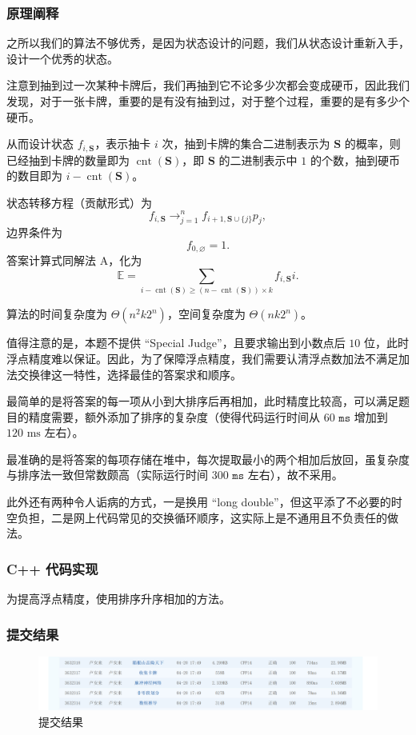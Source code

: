 		\subsubsection{原理阐释}
			\par 之所以我们的算法不够优秀，是因为状态设计的问题，我们从状态设计重新入手，设计一个优秀的状态。
			\par 注意到抽到过一次某种卡牌后，我们再抽到它不论多少次都会变成硬币，因此我们发现，对于一张卡牌，重要的是有没有抽到过，对于整个过程，重要的是有多少个硬币。
			\par 从而设计状态 $f_{i,\mathbf{S}}$，表示抽卡 $i$ 次，抽到卡牌的集合二进制表示为 $\mathbf{S}$ 的概率，则已经抽到卡牌的数量即为 $\operatorname{cnt}(\mathbf{S})$，即 $\mathbf{S}$ 的二进制表示中 $1$ 的个数，抽到硬币的数目即为 $i-\operatorname{cnt}(\mathbf{S})$。
			\par 状态转移方程（贡献形式）为
			$$f_{i,\mathbf{S}}\to_{j=1}^n f_{i+1,\mathbf{S}\cup\{j\}}p_j,$$
			边界条件为
			$$f_{0,\varnothing}=1.$$
			答案计算式同解法 A，化为
			$$\mathbb{E}=\sum\limits_{i-\operatorname{cnt}(\mathbf{S})\geq\left(n-\operatorname{cnt}(\mathbf{S})\right)\times k}f_{i,\mathbf{S}}i.$$
			\par 算法的时间复杂度为 $\Theta(n^2k2^n)$，空间复杂度为 $\Theta(nk2^n)$。
			\par 值得注意的是，本题不提供 ``Special Judge''，且要求输出到小数点后 $10$ 位，此时浮点精度难以保证。因此，为了保障浮点精度，我们需要认清浮点数加法不满足加法交换律这一特性，选择最佳的答案求和顺序。
			\par 最简单的是将答案的每一项从小到大排序后再相加，此时精度比较高，可以满足题目的精度需要，额外添加了排序的复杂度（使得代码运行时间从 $60\texttt{ ms}$ 增加到 $120\text{ ms}$ 左右）。
			\par 最准确的是将答案的每项存储在堆中，每次提取最小的两个相加后放回，虽复杂度与排序法一致但常数颇高（实际运行时间 $300\texttt{ ms}$ 左右），故不采用。
			\par 此外还有两种令人诟病的方式，一是换用 ``long double''，但这平添了不必要的时空负担，二是网上代码常见的交换循环顺序，这实际上是不通用且不负责任的做法。
		\subsubsection{C++ 代码实现}
			\par 为提高浮点精度，使用排序升序相加的方法。
			
		\subsubsection{提交结果}
			\begin{figure}[htbp]
				\centering
				\includegraphics[width=1\textwidth]{result.png}
				\caption{提交结果}
			\end{figure}
